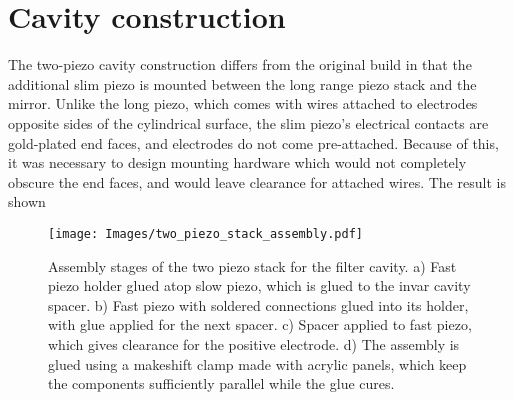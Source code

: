 \section{Cavity construction}

The two-piezo cavity construction differs from the original build in that the additional slim piezo is mounted between the long range piezo stack and the mirror. Unlike the long piezo, which comes with wires attached to electrodes opposite sides of the cylindrical surface, the slim piezo's electrical contacts are gold-plated end faces, and electrodes do not come pre-attached. Because of this, it was necessary to design mounting hardware which would not completely obscure the end faces, and would leave clearance for attached wires. The result is shown 

\begin{figure}[!ht]
    \centering
    \texttt{[image: Images/two\_piezo\_stack\_assembly.pdf]}
    \caption{Assembly stages of the two piezo stack for the filter cavity. a) Fast piezo holder glued atop slow piezo, which is glued to the invar cavity spacer. b) Fast piezo with soldered connections glued into its holder, with glue applied for the next spacer. c) Spacer applied to fast piezo, which gives clearance for the positive electrode. d) The assembly is glued using a makeshift clamp made with acrylic panels, which keep the components sufficiently parallel while the glue cures.}
    \label{fig:cavity_fig1}
\end{figure}